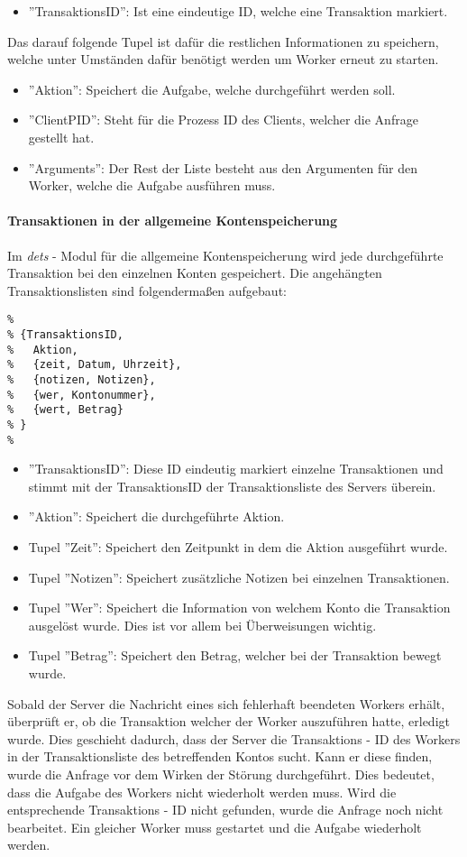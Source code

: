 \begin{itemize}
	\item ''TransaktionsID'': Ist eine eindeutige ID, welche eine Transaktion markiert.
\end{itemize}
Das darauf folgende Tupel ist dafür die restlichen Informationen zu speichern, welche unter Umständen dafür benötigt werden um Worker erneut zu starten.
\begin{itemize}
	\item ''Aktion'': Speichert die Aufgabe, welche durchgeführt werden soll.
	\item ''ClientPID'': Steht für die Prozess ID des Clients, welcher die Anfrage gestellt hat.
	\item ''Arguments'': Der Rest der Liste besteht aus den Argumenten für den Worker, welche die Aufgabe ausführen muss.
\end{itemize}

\paragraph{Transaktionen in der allgemeine Kontenspeicherung}

Im \textit{dets} - Modul für die allgemeine Kontenspeicherung wird jede durchgeführte Transaktion bei den einzelnen Konten gespeichert. Die angehängten Transaktionslisten sind folgendermaßen aufgebaut:

\begin{lstlisting}
% 
% {TransaktionsID,
%	Aktion,
%	{zeit, Datum, Uhrzeit},
%	{notizen, Notizen},
%	{wer, Kontonummer},
%	{wert, Betrag}
% }
%  
\end{lstlisting}

\begin{itemize}
	\item ''TransaktionsID'': Diese ID eindeutig markiert einzelne Transaktionen und stimmt mit der TransaktionsID der Transaktionsliste des Servers überein.
	\item ''Aktion'': Speichert die durchgeführte Aktion.
	\item Tupel ''Zeit'': Speichert den Zeitpunkt in dem die Aktion ausgeführt wurde.
	\item Tupel ''Notizen'': Speichert zusätzliche Notizen bei einzelnen Transaktionen.
	\item Tupel ''Wer'': Speichert die Information von welchem Konto die Transaktion ausgelöst wurde. Dies ist vor allem bei Überweisungen wichtig.
	\item Tupel ''Betrag'': Speichert den Betrag, welcher bei der Transaktion bewegt wurde.
\end{itemize}
Sobald der Server die Nachricht eines sich fehlerhaft beendeten Workers erhält, überprüft er, ob die Transaktion welcher der Worker auszuführen hatte, erledigt wurde. Dies geschieht dadurch, dass der Server die Transaktions - ID des Workers in der Transaktionsliste des betreffenden Kontos sucht. Kann er diese finden, wurde die Anfrage vor dem Wirken der Störung durchgeführt. Dies bedeutet, dass die Aufgabe des Workers nicht wiederholt werden muss. Wird die entsprechende Transaktions - ID nicht gefunden, wurde die Anfrage noch nicht bearbeitet. Ein gleicher Worker muss gestartet und die Aufgabe wiederholt werden.

%
%
%